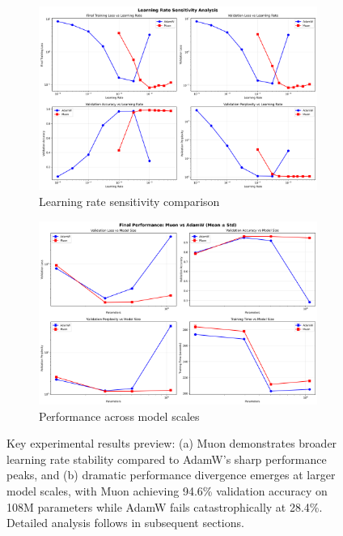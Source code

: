 \documentclass[11pt,a4paper]{article}
\begin{document}
\begin{figure}[H]
    \centering
    \begin{subfigure}[b]{0.48\textwidth}
        \centering
        \includegraphics[width=\textwidth]{results/experiment_1_learning_rate/lr_sensitivity_analysis.png}
        \caption{Learning rate sensitivity comparison}
        \label{fig:preview_lr}
    \end{subfigure}
    \hfill
    \begin{subfigure}[b]{0.48\textwidth}
        \centering
        \includegraphics[width=\textwidth]{results/experiment_2_model_size/final_performance_comparison.png}
        \caption{Performance across model scales}
        \label{fig:preview_scaling}
    \end{subfigure}
    \caption{Key experimental results preview: (a) Muon demonstrates broader learning rate stability compared to AdamW's sharp performance peaks, and (b) dramatic performance divergence emerges at larger model scales, with Muon achieving 94.6\% validation accuracy on 108M parameters while AdamW fails catastrophically at 28.4\%. Detailed analysis follows in subsequent sections.}
    \label{fig:results_preview}
\end{figure}
\end{document}
